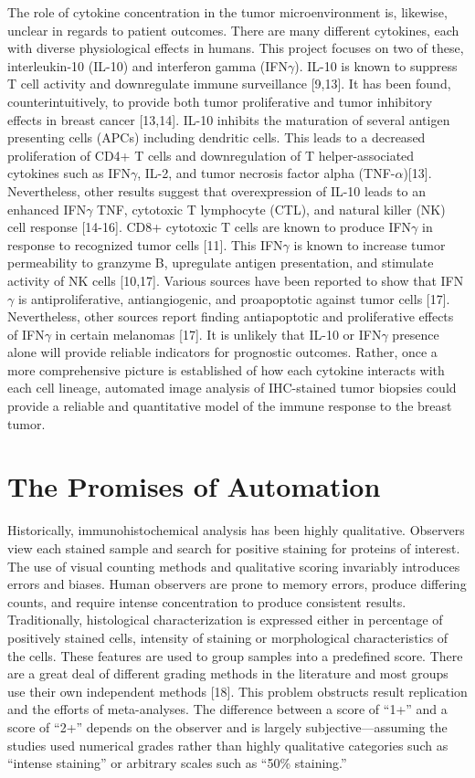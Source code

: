 \documentclass[12pt]{article}
\begin{document}
The role of cytokine concentration in the tumor microenvironment is, likewise, unclear in regards to patient outcomes. There are many different cytokines, each with diverse physiological effects in humans. This project focuses on two of these, interleukin-10 (IL-10) and interferon gamma (IFN$\gamma$). IL-10 is known to suppress T cell activity and downregulate immune surveillance [9,13]. It has been found, counterintuitively, to provide both tumor proliferative and tumor inhibitory effects in breast cancer [13,14]. IL-10 inhibits the maturation of several antigen presenting cells (APCs) including dendritic cells. This leads to a decreased proliferation of CD4+ T cells and downregulation of T helper-associated cytokines such as IFN$\gamma$, IL-2, and tumor necrosis factor alpha (TNF-$\alpha$)[13]. Nevertheless, other results suggest that overexpression of IL-10 leads to an enhanced IFN$\gamma$ TNF, cytotoxic T lymphocyte (CTL), and natural killer (NK) cell response [14-16]. CD8+ cytotoxic T cells are known to produce IFN$\gamma$ in response to recognized tumor cells [11]. This IFN$\gamma$ is known to increase tumor permeability to granzyme B, upregulate antigen presentation, and stimulate activity of NK cells [10,17]. Various sources have been reported to show that IFN$\gamma$ is antiproliferative, antiangiogenic, and proapoptotic against tumor cells [17]. Nevertheless, other sources report finding antiapoptotic and proliferative effects of IFN$\gamma$ in certain melanomas [17]. It is unlikely that IL-10 or IFN$\gamma$ presence alone will provide reliable indicators for prognostic outcomes. Rather, once a more comprehensive picture is established of how each cytokine interacts with each cell lineage, automated image analysis of IHC-stained tumor biopsies could provide a reliable and quantitative model of the immune response to the breast tumor.


\section*{The Promises of Automation}

Historically, immunohistochemical analysis has been highly qualitative. Observers view each stained sample and search for positive staining for proteins of interest. The use of visual counting methods and qualitative scoring invariably introduces errors and biases. Human observers are prone to memory errors, produce differing counts, and require intense concentration to produce consistent results. Traditionally, histological characterization is expressed either in percentage of positively stained cells, intensity of staining or morphological characteristics of the cells. These features are used to group samples into a predefined score. There are a great deal of different grading methods in the literature and most groups use their own independent methods [18]. This problem obstructs result replication and the efforts of meta-analyses. The difference between a score of “1+” and a score of “2+” depends on the observer and is largely subjective—assuming the studies used numerical grades rather than highly qualitative categories such as “intense staining” or arbitrary scales such as “50\% staining.” 
\end{document}
